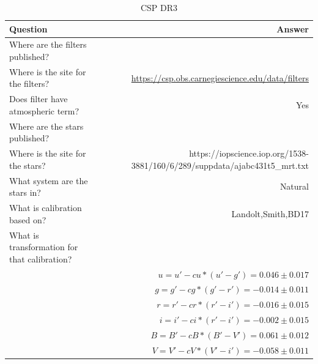 \documentclass[twocolumn]{aastex63}
\begin{document}
\begin{table}
\label{table:information}
\caption{\large CSP DR3}
\begin{tabular}{lr}
\toprule
    Question & Answer \\
\hline

Where are the filters published? & \cite{CSPDR3} \\
Where is the site for the filters? & \url{https://csp.obs.carnegiescience.edu/data/filters}  \\
Does filter have atmospheric term?	& Yes \\
Where are the stars published? & \cite{cspdr3stars} \\
Where is the site for the stars? & https://iopscience.iop.org/1538-3881/160/6/289/suppdata/ajabc431t5\_mrt.txt \\
What system are the stars in? & Natural \\
What is calibration based on? & Landolt,Smith,BD17 \\
What is transformation for that calibration? & ~\\
~& $u = u'-cu*(u'-g') = 0.046 \pm 0.017$ \\
~ & $g = g'-cg*(g'-r') = -0.014 \pm 0.011$ \\
~ & $r = r'-cr*(r'-i') = -0.016 \pm 0.015$ \\
~ & $i = i'-ci*(r'-i') = -0.002 \pm 0.015$ \\
~ & $B = B'-cB*(B'-V') = 0.061 \pm 0.012$ \\
~ & $V = V'-cV*(V'-i') = -0.058  \pm 0.011$ \\
\end{tabular}
\end{table}
\end{document}
